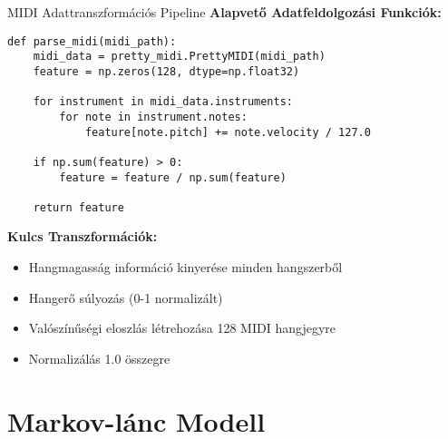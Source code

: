 \documentclass[aspectratio=169]{beamer}
\begin{document}
\begin{frame}[fragile]{MIDI Adattranszformációs Pipeline}
\textbf{Alapvető Adatfeldolgozási Funkciók:}

\begin{lstlisting}
def parse_midi(midi_path):
    midi_data = pretty_midi.PrettyMIDI(midi_path)
    feature = np.zeros(128, dtype=np.float32)
    
    for instrument in midi_data.instruments:
        for note in instrument.notes:
            feature[note.pitch] += note.velocity / 127.0
    
    if np.sum(feature) > 0:
        feature = feature / np.sum(feature)
    
    return feature
\end{lstlisting}

\textbf{Kulcs Transzformációk:}
\begin{itemize}
    \item Hangmagasság információ kinyerése minden hangszerből
    \item Hangerő súlyozás (0-1 normalizált)
    \item Valószínűségi eloszlás létrehozása 128 MIDI hangjegyre
    \item Normalizálás 1.0 összegre
\end{itemize}
\end{frame}

\section{Markov-lánc Modell}
\end{document}
